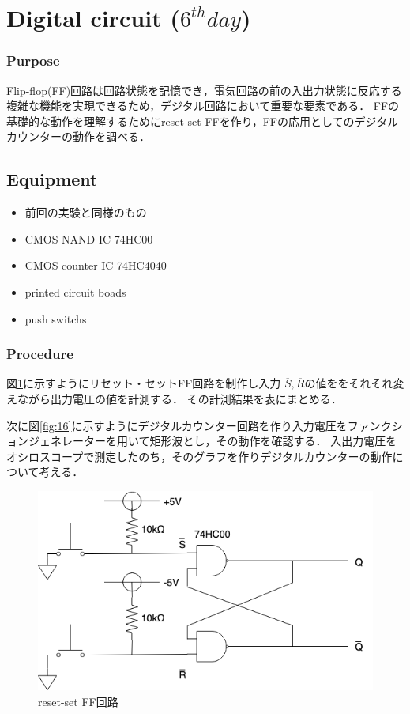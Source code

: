 \documentclass[11pt, a4paper,twocolumn]{jarticle}
\begin{document}
\section{Digital circuit ($6^{th} day$)}
\subsubsection{Purpose}
Flip-flop(FF)回路は回路状態を記憶でき，電気回路の前の入出力状態に反応する複雑な機能を実現できるため，デジタル回路において重要な要素である．
FFの基礎的な動作を理解するためにreset-set FFを作り，FFの応用としてのデジタルカウンターの動作を調べる．
\subsection{Equipment}
\begin{itemize}
    \item 前回の実験と同様のもの
    \item CMOS NAND IC 74HC00
    \item CMOS counter IC 74HC4040
    \item printed circuit boads
    \item push switchs
\end{itemize}
\subsubsection{Procedure}
図\ref{fig:15}に示すようにリセット・セットFF回路を制作し入力
$\overline{S},\overline{R}$の値ををそれそれ変えながら出力電圧の値を計測する．
その計測結果を表にまとめる．

次に図\ref{fig:16}に示すようにデジタルカウンター回路を作り入力電圧をファンクションジェネレーターを用いて矩形波とし，その動作を確認する．
入出力電圧をオシロスコープで測定したのち，そのグラフを作りデジタルカウンターの動作について考える．

\begin{figure}[htbp]
 \begin{center}
  \includegraphics[width=0.8\linewidth]{fig15.png}
 \end{center}
 \caption{reset-set FF回路}
 \label{fig:15}
\end{figure}
\end{document}
